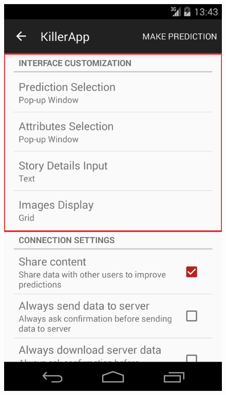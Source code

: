 \documentclass{mproj}
\begin{document}
\begin{figure}[h]
	\centering
		\includegraphics[width=\linewidth]{images/settings_interface}
		\caption{Interface Settings.}
		\label{fig:settings_interface}		
	\endminipage\quad
		\centering
		\begin{subfigure}{0.4\linewidth}

\end{subfigure}
\end{figure}
\end{document}
